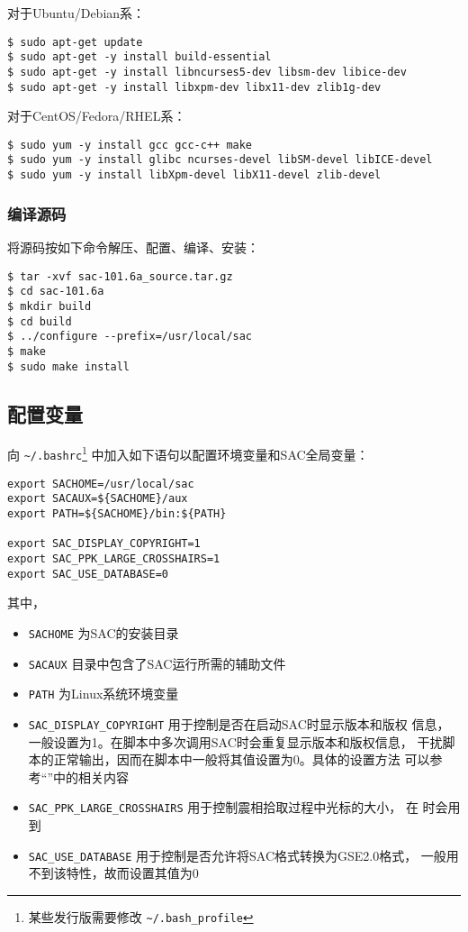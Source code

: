 对于Ubuntu/Debian系：
\begin{verbatim}
$ sudo apt-get update
$ sudo apt-get -y install build-essential
$ sudo apt-get -y install libncurses5-dev libsm-dev libice-dev
$ sudo apt-get -y install libxpm-dev libx11-dev zlib1g-dev
\end{verbatim}

对于CentOS/Fedora/RHEL系：
\begin{verbatim}
$ sudo yum -y install gcc gcc-c++ make
$ sudo yum -y install glibc ncurses-devel libSM-devel libICE-devel
$ sudo yum -y install libXpm-devel libX11-devel zlib-devel
\end{verbatim}

\subsubsection{编译源码}
将源码按如下命令解压、配置、编译、安装：
\begin{verbatim}
$ tar -xvf sac-101.6a_source.tar.gz
$ cd sac-101.6a
$ mkdir build
$ cd build
$ ../configure --prefix=/usr/local/sac
$ make
$ sudo make install
\end{verbatim}

\subsection{配置变量}
向 \verb|~/.bashrc|\footnote{某些发行版需要修改 \verb|~/.bash_profile|}
中加入如下语句以配置环境变量和SAC全局变量：
\begin{verbatim}
export SACHOME=/usr/local/sac
export SACAUX=${SACHOME}/aux
export PATH=${SACHOME}/bin:${PATH}

export SAC_DISPLAY_COPYRIGHT=1
export SAC_PPK_LARGE_CROSSHAIRS=1
export SAC_USE_DATABASE=0
\end{verbatim}

其中，
\begin{itemize}
\item \texttt{SACHOME} 为SAC的安装目录
\item \texttt{SACAUX} 目录中包含了SAC运行所需的辅助文件
\item \texttt{PATH} 为Linux系统环境变量
\item \verb|SAC_DISPLAY_COPYRIGHT| 用于控制是否在启动SAC时显示版本和版权
    信息，一般设置为1。在脚本中多次调用SAC时会重复显示版本和版权信息，
    干扰脚本的正常输出，因而在脚本中一般将其值设置为0。具体的设置方法
    可以参考``''中的相关内容
\item \verb|SAC_PPK_LARGE_CROSSHAIRS| 用于控制震相拾取过程中光标的大小，
    在  时会用到
\item \verb|SAC_USE_DATABASE| 用于控制是否允许将SAC格式转换为GSE2.0格式，
    一般用不到该特性，故而设置其值为0
\end{itemize}

